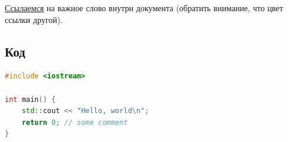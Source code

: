 \hyperlink{link-to-word}{Ссылаемся} на важное слово внутри документа (обратить внимание, что цвет ссылки другой).

\subsection{Код}

\begin{lstlisting}[language=C++]
#include <iostream>

int main() {
    std::cout << "Hello, world\n";
    return 0; // some comment
}
\end{lstlisting}
